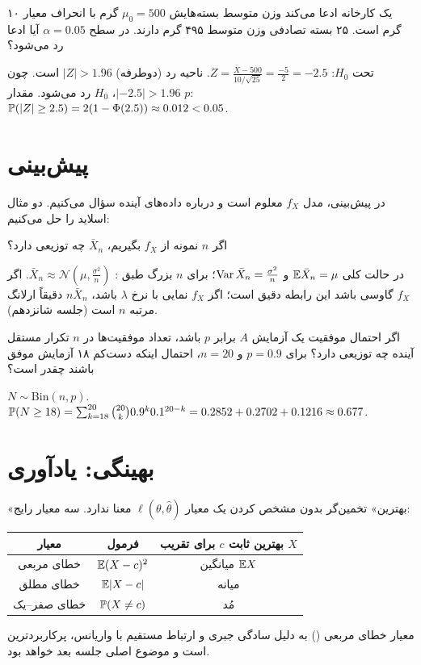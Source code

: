 \begin{example}
یک کارخانه ادعا می‌کند وزن متوسط بسته‌هایش $\mu_0=500$ گرم با انحراف معیار ۱۰ گرم است. ۲۵ بسته تصادفی وزن متوسط ۴۹۵ گرم دارند. در سطح $\alpha=0.05$ آیا ادعا رد می‌شود؟
\begin{solution}
تحت $H_0$: $Z=\frac{\bar X-500}{10/\sqrt{25}}=\frac{-5}{2}=-2.5$. ناحیه رد (دوطرفه) $|Z|>1.96$ است. چون $|{-2.5}|>1.96$، $H_0$ رد می‌شود. مقدار $p$: $\mathbb{P}(|Z|\ge2.5)=2(1-\Phi(2.5))\approx0.012<0.05$.
\end{solution}
\end{example}

\section{پیش‌بینی }
در پیش‌بینی، مدل $f_X$ معلوم است و درباره داده‌های آینده سؤال می‌کنیم. دو مثال اسلاید را حل می‌کنیم:

\begin{example}
اگر $n$ نمونه  از $f_X$ بگیریم، $\bar X_n$ چه توزیعی دارد؟
\begin{solution}
در حالت کلی $\mathbb{E}\bar X_n=\mu$ و $\operatorname{Var}\bar X_n=\frac{\sigma^2}{n}$؛ برای $n$ بزرگ طبق : $\bar X_n\approx\mathcal N(\mu,\frac{\sigma^2}{n})$. اگر $f_X$ گاوسی باشد این رابطه دقیق است؛ اگر $f_X$ نمایی با نرخ $\lambda$ باشد، $n\bar X_n$ دقیقاً ارلانگ مرتبه $n$ است (جلسه شانزدهم).
\end{solution}
\end{example}

\begin{example}
اگر احتمال موفقیت یک آزمایش $A$ برابر $p$ باشد، تعداد موفقیت‌ها در $n$ تکرار مستقل آینده چه توزیعی دارد؟ برای $p=0.9$ و $n=20$، احتمال اینکه دست‌کم ۱۸ آزمایش موفق باشند چقدر است؟
\begin{solution}
$N\sim\mathrm{Bin}(n,p)$. $\mathbb{P}(N\ge18)=\sum_{k=18}^{20}\binom{20}{k}0.9^k0.1^{20-k}=0.2852+0.2702+0.1216\approx0.677$.
\end{solution}
\end{example}

\section{بهینگی: یادآوری}
«بهترین» تخمین‌گر بدون مشخص کردن یک معیار $\ell(\theta,\hat\theta)$ معنا ندارد. سه معیار رایج:
\begin{center}
\renewcommand{\arraystretch}{1.4}
\begin{tabular}{c|c|c}
معیار & فرمول & بهترین ثابت $c$ برای تقریب $X$\\\hline
خطای مربعی & $\mathbb{E}(X-c)^2$ & میانگین $\mathbb{E} X$\\
خطای مطلق & $\mathbb{E}|X-c|$ & میانه\\
خطای صفر--یک & $\mathbb{P}(X\neq c)$ & مُد
\end{tabular}
\end{center}
معیار خطای مربعی () به دلیل سادگی جبری و ارتباط مستقیم با واریانس، پرکاربردترین است و موضوع اصلی جلسه بعد خواهد بود.

